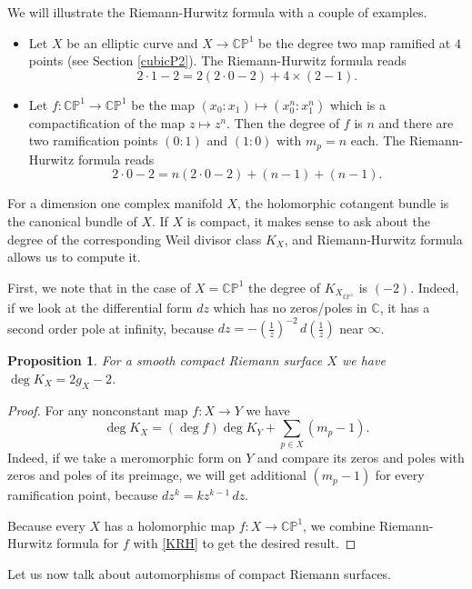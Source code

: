 \documentclass[11pt]{article}
\numberwithin{equation}{section}
\numberwithin{footnote}{section}
\newtheorem{prop}[thm]{Proposition}
\newcommand{\blue}{\color{blue}}
\renewcommand{\P}{{\mathbb P}}
\newcommand{\C}{{\mathbb C}}
\begin{document}
We will illustrate the Riemann-Hurwitz formula with a couple of examples.

\begin{itemize}
\item
Let $X$ be an elliptic curve and $X\to \C\P^1$ be the degree two map ramified at $4$ points (see Section \ref{cubicP2}).
The Riemann-Hurwitz formula reads
$$
2\cdot 1 -2 = 2(2\cdot 0 - 2) + 4 \times (2-1).
$$
\item
Let $f:\C\P^1\to \C\P^1$ be the map $(x_0:x_1)\mapsto (x_0^n:x_1^n)$ which is a compactification of the map $z\mapsto z^n$. Then the degree of $f$ is $n$ and there are two ramification points $(0:1)$ and $(1:0)$ with $m_p=n$ each. The Riemann-Hurwitz formula reads
$$
2\cdot 0 -2 = n(2\cdot 0 -2) + (n-1)+(n-1).
$$
\end{itemize}

\smallskip{\blue \hrule}
For a dimension one complex manifold $X$, the holomorphic cotangent bundle is the canonical bundle of $X$. If $X$ is compact, it makes sense to ask about the degree of the corresponding Weil divisor class $K_X$, and Riemann-Hurwitz formula allows us to compute it.

\smallskip
First, we note that in the case of $X=\C\P^1$ the degree of $K_{X_{\C\P^1}}$ is $(-2)$. Indeed, if we look at the differential form $dz$ which has no zeros/poles in $\C$, it has a second order pole at infinity, because $dz = -\left(\frac 1z\right)^{-2}\, d\left(\frac 1z\right)$ near $\infty$.

\smallskip
\begin{prop}\label{degcan} For a smooth compact Riemann surface $X$ we have
$\deg K_X = 2g_X-2$.
\end{prop}

\begin{proof}
For any nonconstant map $f:X\to Y$ we have 
\begin{equation}\label{KRH}
\deg K_X = (\deg f)  \deg K_Y + \sum_{p\in X} (m_p-1).
\end{equation}
Indeed, if we take a meromorphic form on $Y$ and compare its zeros and poles with zeros and poles of its preimage, we will get additional
$(m_p-1)$ for every ramification point, because $dz^k = kz^{k-1}\,dz$.

Because every $X$ has a holomorphic map  $f:X\to \C\P^1$, we combine Riemann-Hurwitz formula for $f$ with \eqref{KRH} to get the desired result.
\end{proof}

\smallskip{\blue \hrule}
Let us now talk about automorphisms of compact Riemann surfaces.
\end{document}
